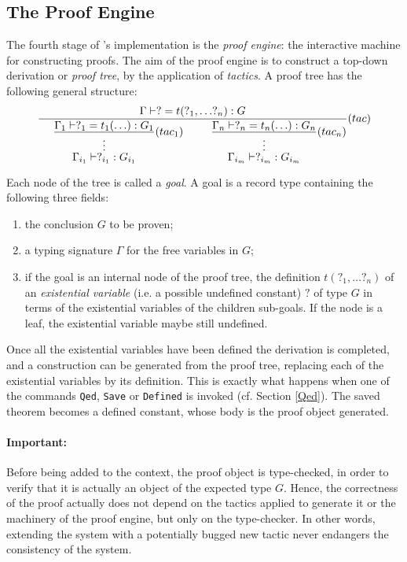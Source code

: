 \subsection{The Proof Engine}

The fourth stage of \Coq's implementation is the \textsl{proof engine}:
the interactive machine for constructing proofs. The aim of the proof
engine is to construct a top-down derivation or \textsl{proof tree},
by the application of \textsl{tactics}. A proof tree has the following
general structure:\\

\begin{displaymath}
\frac{\Gamma \vdash ? = t(?_1,\ldots?_n) : G}
     {\hspace{3ex}\frac{\displaystyle \Gamma_1 \vdash ?_1 = t_1(\ldots) : G_1}
         {\stackrel{\vdots}{\displaystyle {\Gamma_{i_1} \vdash ?_{i_1} 
           : G_{i_1}}}}(tac_1)
      \;\;\;\;\;\;\;\;\;
      \frac{\displaystyle \Gamma_n \vdash ?_n = t_n(\ldots) : G_n}
         {\displaystyle \stackrel{\vdots}{\displaystyle {\Gamma_{i_m} \vdash ?_{i_m} :
     G_{i_m}}}}(tac_n)} (tac)    
\end{displaymath}


\noindent Each node of the tree is called a \textsl{goal}. A goal
is a record type containing the following three fields:
\begin{enumerate}
\item the conclusion $G$ to be proven;
\item a typing signature $\Gamma$ for the free variables in $G$;
\item if the goal is an internal node of the proof tree, the
definition $t(?_1,\ldots?_n)$ of an \textsl{existential variable}
(i.e. a possible undefined constant) $?$ of type $G$ in terms of the
existential variables of the children sub-goals. If the node is a
leaf, the existential variable maybe still undefined.
\end{enumerate}

Once all the existential variables have been defined the derivation is
completed, and a construction can be generated from the proof tree,
replacing each of the existential variables by its definition.  This
is exactly what happens when one of the commands
\texttt{Qed}, \texttt{Save} or \texttt{Defined} is invoked
(cf. Section \ref{Qed}). The saved theorem becomes a defined constant,
whose body is the proof object generated.

\paragraph{Important:} Before being added to the
context, the proof object is type-checked, in order to verify that it is
actually an object of the expected type $G$.  Hence, the correctness
of the proof actually does not depend on the tactics applied to
generate it or the machinery of the proof engine, but only on the
type-checker. In other words, extending the system with a potentially
bugged new tactic never endangers the consistency of the system.

